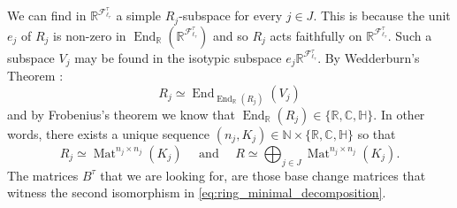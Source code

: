 \documentclass[a4paper,11pt]{article}
\numberwithin{equation}{section}
\newcommand{\mF}{\mathcal{F}}
\newcommand{\RR}{\mathbb{R}}
\begin{document}
We can find in $\mathbb R^{\mF^\tau_{\ell_\tau}}$ a simple $R_j$-subspace for every $j\in J$. This is because the unit $e_j$ of $R_j$ is non-zero in $\operatorname{End}_{\mathbb R}(\RR^{\mF^\tau_{\ell_\tau}})$ and so $R_j$ acts faithfully on $\mathbb R^{\mF^\tau_{\ell_\tau}}$. Such a subspace $V_j$ may be found in the isotypic subspace $e_j\RR^{\mF^\tau_{\ell_\tau}}$. By Wedderburn's Theorem \cite[pp. 649, Corollary 3.5]{SergeLang2002}:
%
\[
    R_j \simeq \operatorname{End}_{\operatorname{End}_{\mathbb R}(R_j)}(V_j)
\]
%
and by Frobenius's theorem we know that $\operatorname{End}_{\RR}(R_j)\in \{\mathbb R,\mathbb C, \mathbb H\}$.
In other words, there exists a unique sequence $(n_j,K_j)\in \mathbb N\times \{\mathbb R, \mathbb C, \mathbb H\}$ so that
\begin{equation}\label{eq:ring_minimal_decomposition}
    R_j \simeq \operatorname{Mat}^{n_j\times n_j}(K_j)
    \quad \text{ and }
    \quad 
    R \simeq \bigoplus_{j\in J} \operatorname{Mat}^{n_j\times n_j}(K_j).
\end{equation}
The matrices $B^\tau$ that we are looking for, are those base change matrices that witness the second isomorphism in \cref{eq:ring_minimal_decomposition}.
\end{document}
